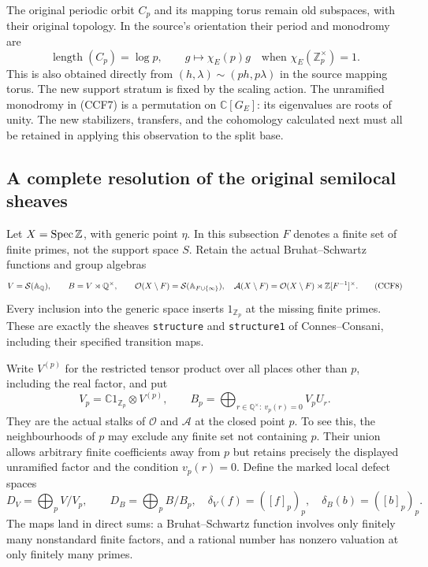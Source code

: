 The original periodic orbit $C_p$ and its mapping torus remain
old subspaces, with their original topology. In the source's
orientation their period and monodromy are
\[
 \operatorname{length}(C_p)=\log p,\qquad g\longmapsto\chi_E(p)g
 \quad\text{when }\chi_E(\mathbb Z_p^\times)=1.
 \tag{CCF7}
\]
This is also obtained directly from
$(h,\lambda)\sim(ph,p\lambda)$ in the source mapping torus.
The new support stratum is fixed by the scaling action. The
unramified monodromy in (CCF7) is a permutation on $\mathbb C[G_E]$:
its eigenvalues are roots of unity. The new stabilizers, transfers,
and the cohomology calculated next must all be retained in applying
this observation to the split base.

\subsection{A complete resolution of the original semilocal sheaves}

Let $X=\operatorname{Spec}\mathbb Z$, with generic point $\eta$. In this subsection
$F$ denotes a finite set of finite primes, not the support space $S$.
Retain the actual Bruhat--Schwartz functions and group algebras
\[
 V=\mathcal S(\mathbb A_{\mathbb Q}),\qquad
 B=V\rtimes\mathbb Q^\times,\qquad
 \mathcal O(X\setminus F)=\mathcal S(\mathbb A_{F\cup\{\infty\}}),
 \quad
 \mathcal A(X\setminus F)=\mathcal O(X\setminus F)
               \rtimes\mathbb Z[F^{-1}]^\times.
 \tag{CCF8}
\]
Every inclusion into the generic space inserts $1_{\mathbb Z_p}$
at the missing finite primes. These are exactly the sheaves
\texttt{structure} and \texttt{structure1} of Connes--Consani,
including their specified transition maps.

Write $V^{(p)}$ for the restricted tensor product over all places
other than $p$, including the real factor, and put
\[
 V_p=\mathbb C1_{\mathbb Z_p}\otimes V^{(p)},\qquad
 B_p=\bigoplus_{r\in\mathbb Q^\times:\ v_p(r)=0}V_pU_r.
 \tag{CCF9}
\]
They are the actual stalks of $\mathcal O$ and $\mathcal A$ at
the closed point $p$. To see this, the neighbourhoods of $p$ may
exclude any finite set not containing $p$. Their union allows
arbitrary finite coefficients away from $p$ but retains precisely
the displayed unramified factor and the condition $v_p(r)=0$.
Define the marked local defect spaces
\[
 D_V=\bigoplus_p V/V_p,\qquad D_B=\bigoplus_p B/B_p,
 \quad \delta_V(f)=([f]_p)_p,\quad\delta_B(b)=([b]_p)_p.
 \tag{CCF10}
\]
The maps land in direct sums: a Bruhat--Schwartz function involves
only finitely many nonstandard finite factors, and a rational
number has nonzero valuation at only finitely many primes.

